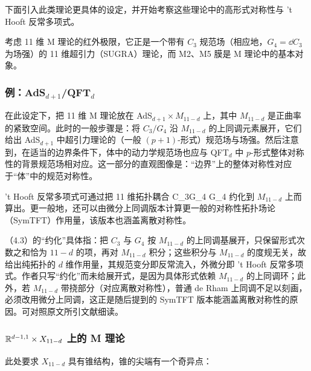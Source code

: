 下面引入此类理论更具体的设定，并开始考察这些理论中的高形式对称性与 't Hooft 反常多项式。

考虑 11 维 M 理论的红外极限，它正是一个带有 $C_3$ 规范场（相应地，$G_4=\dd C_3$ 为场强）的 11 维超引力（SUGRA）理论，而 M2、M5 膜是 M 理论中的基本对象。

\subsubsection{例：AdS$_{d+1}$/QFT$_{d}$}

在此设定下，把 11 维 M 理论放在 AdS$_{d+1}\times M_{11-d}$ 上，其中 $M_{11-d}$ 是正曲率的紧致空间。此时的一般步骤是：将 $C_3/G_4$ 沿 $M_{11-d}$ 的上同调元素展开，它们给出 AdS$_{d+1}$ 中超引力理论的（一般 $(p+1)$-形式）规范场与场强。然后注意到，在适当的边界条件下，体中的动力学规范场也应与 QFT$_{d}$ 中 $p$-形式整体对称性的背景规范场相对应。这一部分的直观图像是：“边界”上的整体对称性对应于“体”中的规范对称性。

't Hooft 反常多项式可通过把 11 维拓扑耦合
\be\int C_3\wedge G_4 \wedge G_4\ee
约化到 $M_{11-d}$ 上而算出。更一般地，还可以由微分上同调版本计算更一般的对称性拓扑场论（SymTFT）作用量，该版本也涵盖离散对称性\cite{Apruzzi:2021nmk,vanBeest:2022fss,Kaidi:2022cpf,Kaidi:2023maf,Chen:2023qnv}。

\begin{yizhu}
（4.3）的“约化”具体指：把 $C_3$ 与 $G_4$ 按 $M_{11-d}$ 的上同调基展开，只保留形式次数之和恰为 $11-d$ 的项，再对 $M_{11-d}$ 积分；这些积分与 $M_{11-d}$ 的度规无关，故给出纯拓扑的 $d$ 维作用量，其规范变分即反常流入，外微分即 't Hooft 反常多项式。作者只写“约化”而未给展开式，是因为具体形式依赖 $M_{11-d}$ 的上同调环；此外，若 $M_{11-d}$ 带挠部分（对应离散对称性），普通 de Rham 上同调不足以刻画，必须改用微分上同调，这正是随后提到的 SymTFT 版本能涵盖离散对称性的原因。可对照原文所引文献细读。
\end{yizhu}

\subsubsection{${\mathbb{R}}^{d-1,1}\times X_{11-d}$ 上的 M 理论}
\label{sssect:M-th}
此处要求 $X_{11-d}$ 具有锥结构，锥的尖端有一个奇异点：

\begin{center}
\end{center}

